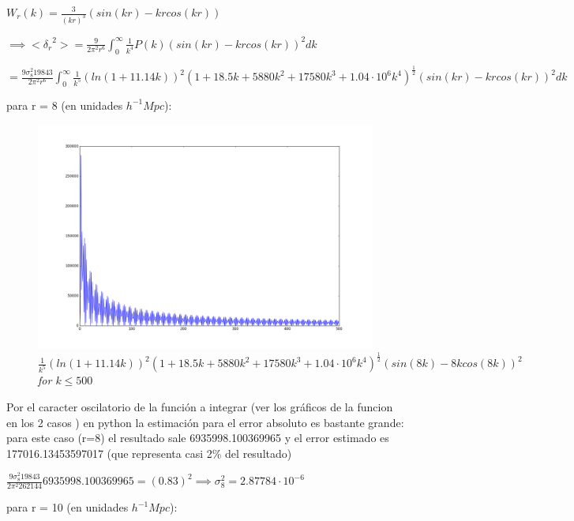 \documentclass[12pt]{book}
\begin{document}
$W_r(k) = \frac{3}{(kr)^3}(sin(kr) - kr cos(kr))$ 

$\implies <{\delta_r}^2> = \frac{9 }{2\pi^2 r^6}\int_0^\infty{\frac{1}{k^4} P(k)(sin(kr) - k r cos(kr))^2 dk }$

$= \frac{9 \sigma_8^2 19843}{2\pi^2 r^6}\int_0^\infty{\frac{1}{k^5}(ln(1+11.14k))^2 
(1+18.5k + 5880k^2+17580k^3 + 1.04 \cdot 10^6 k^4)^{\frac{1}{2}}(sin(kr) - k r cos(kr))^2 dk }$


para r = 8 (en unidades $h^{-1}Mpc$):


\begin{figure}[H]
 \centering
 \includegraphics[scale=0.5]{graf.png}
 \caption{\emph{$ \frac{1}{k^5}(ln(1+11.14k))^2 
(1+18.5k + 5880k^2+17580k^3 + 1.04 \cdot 10^6 k^4)^{\frac{1}{2}}(sin(8k) - 8 k  cos(8k))^2$ for $k\le 500$}}
\end{figure}

Por el caracter oscilatorio de la función  a integrar 
(ver los gráficos de la funcion en los 2 casos ) en python la estimación para el error absoluto es bastante grande:
para este caso (r=8)
el resultado sale 6935998.100369965 y el error estimado es 177016.13453597017 (que representa casi 2\% del resultado)

$\frac{9 \sigma_8^2 19843}{2\pi^2 262144}  6935998.100369965 = (0.83)^2 \implies \sigma_8^2 = 2.87784 \cdot 10^{-6}$

para r = 10 (en unidades $h^{-1}Mpc$):
\end{document}
